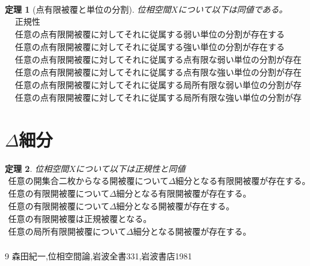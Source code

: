 \documentclass[leqno]{jsarticle}
\newtheorem{thm}{定理}
\begin{document}
\setcounter{equation}{0}
\begin{thm}[点有限被覆と単位の分割]
位相空間$X$について以下は同値である。
\begin{align}
&\mbox{正規性}\\ 
&\mbox{任意の点有限開被覆に対してそれに従属する弱い単位の分割が存在する}\\ 
&\mbox{任意の点有限開被覆に対してそれに従属する強い単位の分割が存在する}\\ 
&\mbox{任意の点有限開被覆に対してそれに従属する点有限な弱い単位の分割が存在する}\\ 
&\mbox{任意の点有限開被覆に対してそれに従属する点有限な強い単位の分割が存在する}\\ 
&\mbox{任意の点有限開被覆に対してそれに従属する局所有限な弱い単位の分割が存在する}\\ 
&\mbox{任意の点有限開被覆に対してそれに従属する局所有限な強い単位の分割が存在する}
\end{align}
\end{thm}

\section*{$\Delta$細分}
\setcounter{equation}{0}
\begin{thm}位相空間$X$について以下は正規性と同値
\begin{align}
\mbox{任意の開集合二枚からなる開被覆について$\Delta$細分となる有限開被覆が存在する。}\\
\mbox{任意の有限開被覆について$\Delta$細分となる有限開被覆が存在する。}\\
\mbox{任意の有限開被覆について$\Delta$細分となる開被覆が存在する。}\\
\mbox{任意の有限開被覆は正規被覆となる。}\\
\mbox{任意の局所有限開被覆について$\Delta$細分となる開被覆が存在する。}\\
\end{align}
\end{thm}

\begin{thebibliography}{9}
森田紀一,位相空間論,岩波全書331,岩波書店1981
\end{thebibliography}
\end{document}
